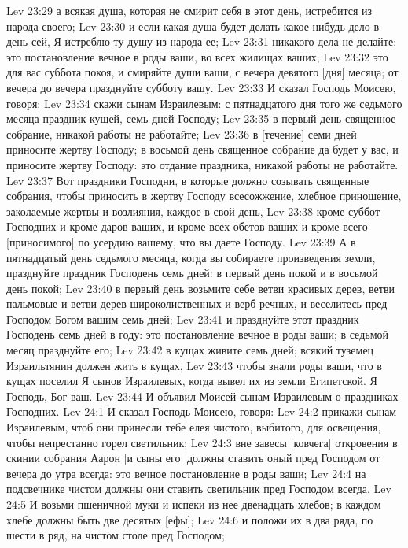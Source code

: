 Lev 23:29  а всякая душа, которая не смирит себя в этот день, истребится из народа своего;
Lev 23:30  и если какая душа будет делать какое-нибудь дело в день сей, Я истреблю ту душу из народа ее;
Lev 23:31  никакого дела не делайте: это постановление вечное в роды ваши, во всех жилищах ваших;
Lev 23:32  это для вас суббота покоя, и смиряйте души ваши, с вечера девятого [дня] месяца; от вечера до вечера празднуйте субботу вашу.
Lev 23:33  И сказал Господь Моисею, говоря:
Lev 23:34  скажи сынам Израилевым: с пятнадцатого дня того же седьмого месяца праздник кущей, семь дней Господу;
Lev 23:35  в первый день священное собрание, никакой работы не работайте;
Lev 23:36  в [течение] семи дней приносите жертву Господу; в восьмой день священное собрание да будет у вас, и приносите жертву Господу: это отдание праздника, никакой работы не работайте.
Lev 23:37  Вот праздники Господни, в которые должно созывать священные собрания, чтобы приносить в жертву Господу всесожжение, хлебное приношение, заколаемые жертвы и возлияния, каждое в свой день,
Lev 23:38  кроме суббот Господних и кроме даров ваших, и кроме всех обетов ваших и кроме всего [приносимого] по усердию вашему, что вы даете Господу.
Lev 23:39  А в пятнадцатый день седьмого месяца, когда вы собираете произведения земли, празднуйте праздник Господень семь дней: в первый день покой и в восьмой день покой;
Lev 23:40  в первый день возьмите себе ветви красивых дерев, ветви пальмовые и ветви дерев широколиственных и верб речных, и веселитесь пред Господом Богом вашим семь дней;
Lev 23:41  и празднуйте этот праздник Господень семь дней в году: это постановление вечное в роды ваши; в седьмой месяц празднуйте его;
Lev 23:42  в кущах живите семь дней; всякий туземец Израильтянин должен жить в кущах,
Lev 23:43  чтобы знали роды ваши, что в кущах поселил Я сынов Израилевых, когда вывел их из земли Египетской. Я Господь, Бог ваш.
Lev 23:44  И объявил Моисей сынам Израилевым о праздниках Господних.
Lev 24:1  И сказал Господь Моисею, говоря:
Lev 24:2  прикажи сынам Израилевым, чтоб они принесли тебе елея чистого, выбитого, для освещения, чтобы непрестанно горел светильник;
Lev 24:3  вне завесы [ковчега] откровения в скинии собрания Аарон [и сыны его] должны ставить оный пред Господом от вечера до утра всегда: это вечное постановление в роды ваши;
Lev 24:4  на подсвечнике чистом должны они ставить светильник пред Господом всегда.
Lev 24:5  И возьми пшеничной муки и испеки из нее двенадцать хлебов; в каждом хлебе должны быть две десятых [ефы];
Lev 24:6  и положи их в два ряда, по шести в ряд, на чистом столе пред Господом;
